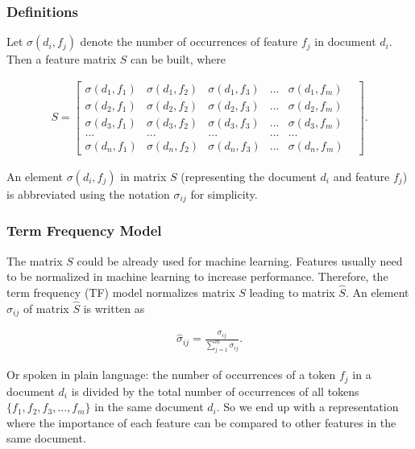 \documentclass[a4paper,12pt,nottoc]{article}
\begin{document}
\subsubsection{Definitions}

Let $\sigma(d_i, f_j)$ denote the number of occurrences of feature $f_j$ in document $d_i$. Then a feature matrix $S$ can be built, where

\begin{gather}
S =
\begin{bmatrix}
\sigma(d_1, f_1) & \sigma(d_1, f_2) & \sigma(d_1, f_3) & ... & \sigma(d_1, f_m) \\
\sigma(d_2, f_1) & \sigma(d_2, f_2) & \sigma(d_2, f_3) & ... & \sigma(d_2, f_m) \\
\sigma(d_3, f_1) & \sigma(d_3, f_2) & \sigma(d_3, f_3) & ... & \sigma(d_3, f_m) \\
... & ... & ... & ... & ... & \\
 \sigma(d_n, f_1) & \sigma(d_n, f_2) & \sigma(d_n, f_3) & ... & \sigma(d_n, f_m)
\end{bmatrix}.
\end{gather}

\noindent An element $\sigma(d_i, f_j)$ in matrix $S$ (representing the document $d_i$ and feature $f_j$) is abbreviated using the notation $\sigma_{ij}$ for simplicity.

\subsubsection{Term Frequency Model}

The matrix $S$ could be already used for machine learning. Features usually need to be normalized in machine learning to increase performance. Therefore, the term frequency (TF) model normalizes matrix $S$ leading to matrix $\hat{S}$. An element $\hat{\sigma}_{ij}$ of matrix $\hat{S}$ is written as

\begin{gather}\label{eq:tf}
\hat{\sigma}_{ij} = \frac{\sigma_{ij}}{\sum_{j=1}^{m}\sigma_{ij}}.
\end{gather}

\noindent Or spoken in plain language: the number of occurrences of a token $f_j$ in a document $d_i$ is divided by the total number of occurrences of all tokens $\{f_1, f_2, f_3, ..., f_m\}$ in the same document $d_i$. So we end up with a representation where the importance of each feature can be compared to other features in the same document.
\end{document}
